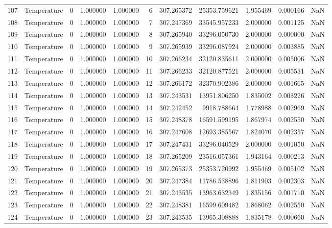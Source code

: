 \begin{tabular}{llrrrrrrrrr}
107 & Temperature & 0 & 1.000000 & 1.000000 & 6 & 307.265372 & 25353.759621 & 1.955469 & 0.000166 & NaN \\
108 & Temperature & 0 & 1.000000 & 1.000000 & 7 & 307.247369 & 33545.957233 & 2.000000 & 0.001125 & NaN \\
109 & Temperature & 0 & 1.000000 & 1.000000 & 8 & 307.265940 & 33296.050730 & 2.000000 & 0.000000 & NaN \\
110 & Temperature & 0 & 1.000000 & 1.000000 & 9 & 307.265939 & 33296.087924 & 2.000000 & 0.003885 & NaN \\
111 & Temperature & 0 & 1.000000 & 1.000000 & 10 & 307.266234 & 32120.835611 & 2.000000 & 0.005006 & NaN \\
112 & Temperature & 0 & 1.000000 & 1.000000 & 11 & 307.266233 & 32120.877521 & 2.000000 & 0.005531 & NaN \\
113 & Temperature & 0 & 1.000000 & 1.000000 & 12 & 307.266172 & 32370.902386 & 2.000000 & 0.001665 & NaN \\
114 & Temperature & 0 & 1.000000 & 1.000000 & 13 & 307.243531 & 13951.806250 & 1.835002 & 0.003226 & NaN \\
115 & Temperature & 0 & 1.000000 & 1.000000 & 14 & 307.242452 & 9918.788664 & 1.778988 & 0.002969 & NaN \\
116 & Temperature & 0 & 1.000000 & 1.000000 & 15 & 307.248378 & 16591.599195 & 1.867974 & 0.002550 & NaN \\
117 & Temperature & 0 & 1.000000 & 1.000000 & 16 & 307.247608 & 12693.385567 & 1.824070 & 0.002357 & NaN \\
118 & Temperature & 0 & 1.000000 & 1.000000 & 17 & 307.247431 & 33296.040529 & 2.000000 & 0.001050 & NaN \\
119 & Temperature & 0 & 1.000000 & 1.000000 & 18 & 307.265209 & 23516.057361 & 1.943164 & 0.000213 & NaN \\
120 & Temperature & 0 & 1.000000 & 1.000000 & 19 & 307.265373 & 25353.720992 & 1.955469 & 0.005102 & NaN \\
121 & Temperature & 0 & 1.000000 & 1.000000 & 20 & 307.247384 & 11786.538896 & 1.811903 & 0.002303 & NaN \\
122 & Temperature & 0 & 1.000000 & 1.000000 & 21 & 307.243535 & 13963.632349 & 1.835156 & 0.001710 & NaN \\
123 & Temperature & 0 & 1.000000 & 1.000000 & 22 & 307.248381 & 16599.609482 & 1.868062 & 0.002550 & NaN \\
124 & Temperature & 0 & 1.000000 & 1.000000 & 23 & 307.243535 & 13965.308888 & 1.835178 & 0.000660 & NaN \\

\end{tabular}
